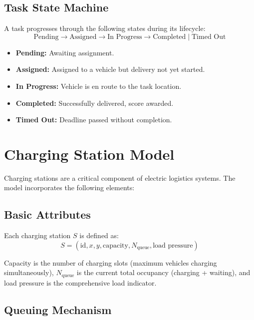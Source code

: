 \subsection{Task State Machine}

A task progresses through the following states during its lifecycle:
\begin{equation}
    \text{Pending} \rightarrow \text{Assigned} \rightarrow \text{In Progress} \rightarrow \text{Completed} \;|\; \text{Timed Out}
\end{equation}

\begin{itemize}[leftmargin=4em]
    \item \textbf{Pending:} Awaiting assignment.
    \item \textbf{Assigned:} Assigned to a vehicle but delivery not yet started.
    \item \textbf{In Progress:} Vehicle is en route to the task location.
    \item \textbf{Completed:} Successfully delivered, score awarded.
    \item \textbf{Timed Out:} Deadline passed without completion.
\end{itemize}

\section{Charging Station Model}

Charging stations are a critical component of electric logistics systems. The model incorporates the following elements:

\subsection{Basic Attributes}

Each charging station $S$ is defined as:
\begin{equation}
    S = (\text{id}, x, y, \text{capacity}, N_{\text{queue}}, \text{load pressure})
\end{equation}

Capacity is the number of charging slots (maximum vehicles charging simultaneously), $N_{\text{queue}}$ is the current total occupancy (charging + waiting), and load pressure is the comprehensive load indicator.

\subsection{Queuing Mechanism}

